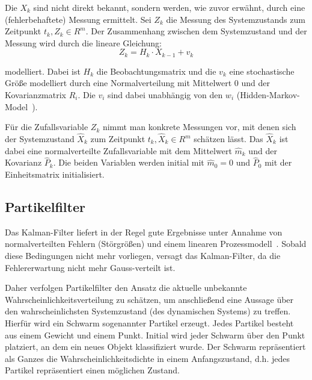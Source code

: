 \documentclass[a4paper, 11pt, twocolumn]{article}
\begin{document}
Die $X_k$ sind nicht direkt bekannt, sondern werden, wie zuvor erwähnt, durch eine (fehlerbehaftete) Messung ermittelt. Sei $Z_k$ die Messung des Systemzustands zum Zeitpunkt $t_k, Z_k \in R^m$. Der Zusammenhang zwischen dem Systemzustand und der Messung wird durch die lineare Gleichung:
\[
	Z_k = H_k \cdot X_{k-1} + v_k
\]

modelliert. Dabei ist $H_k$ die Beobachtungsmatrix und die $v_k$ eine stochastische Größe modelliert durch eine Normalverteilung mit Mittelwert 0 und der Kovarianzmatrix $R_i$. Die $v_i$ sind dabei unabhängig von den $w_i$ (Hidden-Markov-Model~\cite{MarslandBook}). 

Für die Zufallsvariable $Z_k$ nimmt man konkrete Messungen vor, mit denen sich der Systemzustand $\widehat{X}_k$ zum Zeitpunkt $t_k, \widehat{X}_k \in R^m$ schätzen lässt. Das $\widehat{X}_k$ ist dabei eine normalverteilte Zufallsvariable mit dem Mittelwert $\widehat{m}_k$ und der Kovarianz $\widehat{P}_k$.
Die beiden Variablen werden initial mit $\widehat{m}_0 = 0$ und $\widehat{P}_0$ mit der Einheitsmatrix initialisiert. 


\subsection{Partikelfilter} %
\label{sub:partikelfilter}

Das Kalman-Filter liefert in der Regel gute Ergebnisse unter Annahme von normalverteilten Fehlern (Störgrößen) und einem linearen Prozessmodell~\cite{MarslandBook}. Sobald diese Bedingungen nicht mehr vorliegen, versagt das Kalman-Filter, da die Fehlererwartung nicht mehr Gauss-verteilt ist.

Daher verfolgen Partikelfilter den Ansatz die aktuelle unbekannte Wahrscheinlichkeitsverteilung zu schätzen, um anschließend eine Aussage über den wahrscheinlichsten Systemzustand (des dynamischen Systems) zu treffen\cite{Doucet2009}. Hierfür wird ein Schwarm sogenannter Partikel erzeugt. Jedes Partikel besteht aus einem Gewicht und einem Punkt. Initial wird jeder Schwarm über den Punkt platziert, an dem ein neues Objekt klassifiziert wurde. Der Schwarm repräsentiert als Ganzes die Wahrscheinlichkeitsdichte in einem Anfangszustand, d.h. jedes Partikel repräsentiert einen möglichen Zustand.
\end{document}

